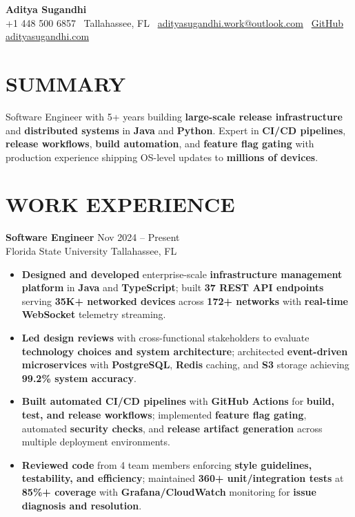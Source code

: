 \documentclass[letterpaper,10pt]{article}
\newcommand{\resumeItem}[1]{\item\small #1}
\newcommand{\resumeSubheading}[4]{
  \vspace{6pt}
  \noindent
  \textbf{#1} \hfill {\footnotesize #2} \\
  [-1pt]
  \noindent
  \small #3 \hfill {\small #4}
  \vspace{3pt}
}
\newcommand{\resumeItemsStart}{\vspace{-2pt}\begin{itemize}}
\newcommand{\resumeItemsEnd}{\end{itemize}\vspace{6pt}}
\begin{document}
\begin{center}
{\huge\textbf{Aditya Sugandhi}} \\
+1 448 500 6857 \textbar\ \textcolor{metablue}{Tallahassee, FL} \textbar\
\href{mailto:adityasugandhi.work@outlook.com}{adityasugandhi.work@outlook.com} \textbar\
\href{https://github.com/adityasugandhi}{GitHub}
\textbar \href{https://adityasugandhi.com}{adityasugandhi.com}
\end{center}
\vspace{-12pt}

\section{\textcolor{metablue}{SUMMARY}}
\small
\vspace{-6pt}
Software Engineer with 5+ years building \textbf{large-scale release infrastructure} and \textbf{distributed systems} in \textbf{Java} and \textbf{Python}. Expert in \textbf{CI/CD pipelines}, \textbf{release workflows}, \textbf{build automation}, and \textbf{feature flag gating} with production experience shipping OS-level updates to \textbf{millions of devices}.

\vspace{-9pt}

\section{\textcolor{metablue}{WORK EXPERIENCE}}
\vspace{-12pt}

\resumeSubheading
{Software Engineer}{Nov 2024 -- Present}
{Florida State University}{Tallahassee, FL}
\resumeItemsStart
\resumeItem{\textbf{Designed and developed} enterprise-scale \textbf{infrastructure management platform} in \textbf{Java} and \textbf{TypeScript}; built \textbf{37 REST API endpoints} serving \textbf{35K+ networked devices} across \textbf{172+ networks} with \textbf{real-time WebSocket} telemetry streaming.}
\resumeItem{\textbf{Led design reviews} with cross-functional stakeholders to evaluate \textbf{technology choices and system architecture}; architected \textbf{event-driven microservices} with \textbf{PostgreSQL}, \textbf{Redis} caching, and \textbf{S3} storage achieving \textbf{99.2\% system accuracy}.}
\resumeItem{\textbf{Built automated CI/CD pipelines} with \textbf{GitHub Actions} for \textbf{build, test, and release workflows}; implemented \textbf{feature flag gating}, automated \textbf{security checks}, and \textbf{release artifact generation} across multiple deployment environments.}
\resumeItem{\textbf{Reviewed code} from 4 team members enforcing \textbf{style guidelines, testability, and efficiency}; maintained \textbf{360+ unit/integration tests} at \textbf{85\%+ coverage} with \textbf{Grafana/CloudWatch} monitoring for \textbf{issue diagnosis and resolution}.}
\resumeItemsEnd
\vspace{-12pt}
\end{document}
